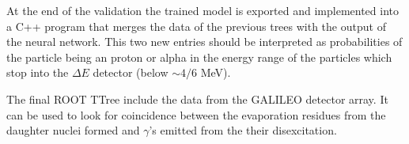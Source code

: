 At the end of the validation the trained model is exported and implemented into a C++ program that merges the data of the previous trees with the output of the neural network. This two new entries should be interpreted as probabilities of the particle being an proton or alpha in the energy range of the particles which stop into the $\Delta E$ detector (below $\sim \num{4}/\num{6}$ MeV). 

The final ROOT TTree include the data from the GALILEO detector array. It can be used to look for coincidence between the evaporation residues from the daughter nuclei formed and $\gamma$'s emitted from the their disexcitation.





